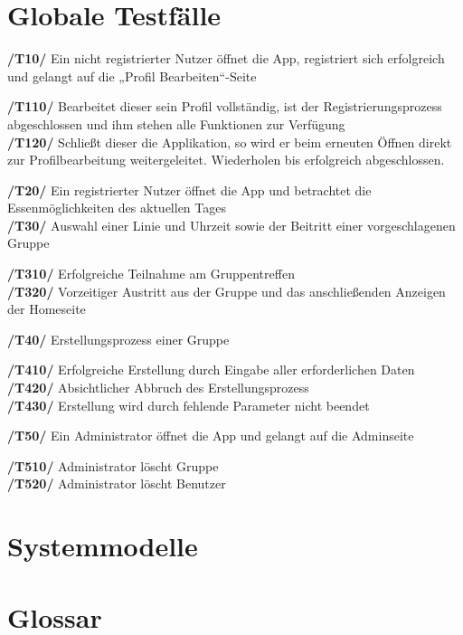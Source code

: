 \documentclass[a4paper]{scrreprt}
\begin{document}
\chapter{Globale Testfälle}
\begin{addmargin}[25pt]{0pt} 
\textbf{/T10/} Ein nicht registrierter Nutzer öffnet die App, registriert sich erfolgreich und gelangt auf die „Profil Bearbeiten“-Seite\\
  \begin{addmargin}[25pt]{0pt} 
  \textbf{/T110/} Bearbeitet dieser sein Profil vollständig, ist der Registrierungsprozess abgeschlossen und ihm stehen alle Funktionen zur Verfügung\\
  \textbf{/T120/} Schließt dieser die Applikation, so wird er beim erneuten Öffnen direkt zur Profilbearbeitung weitergeleitet. Wiederholen bis erfolgreich abgeschlossen.\\
  \end{addmargin}
\textbf{/T20/}  Ein registrierter Nutzer öffnet die App und betrachtet die Essenmöglichkeiten des aktuellen Tages\\
\textbf{/T30/} Auswahl einer Linie und Uhrzeit sowie der Beitritt einer vorgeschlagenen Gruppe\\
  \begin{addmargin}[25pt]{0pt} 
  \textbf{/T310/} Erfolgreiche Teilnahme am Gruppentreffen\\
  \textbf{/T320/} Vorzeitiger Austritt aus der Gruppe und das anschließenden Anzeigen der Homeseite\\
  \end{addmargin}
\textbf{/T40/}  Erstellungsprozess einer Gruppe\\
  \begin{addmargin}[25pt]{0pt} 
  \textbf{/T410/} Erfolgreiche Erstellung durch Eingabe aller erforderlichen Daten\\
  \textbf{/T420/} Absichtlicher Abbruch des Erstellungsprozess\\
  \textbf{/T430/} Erstellung wird durch fehlende Parameter nicht beendet\\
  \end{addmargin}
\textbf{/T50/} Ein Administrator öffnet die App und gelangt auf die Adminseite\\
  \begin{addmargin}[25pt]{0pt} 
  \textbf{/T510/} Administrator löscht Gruppe\\
  \textbf{/T520/} Administrator löscht Benutzer\\
  \end{addmargin}



\end{addmargin}

\chapter{Systemmodelle}

\chapter{Glossar}
 

 
\end{document}
